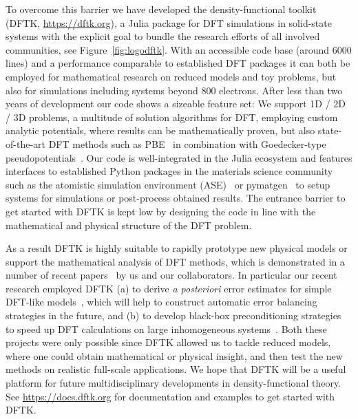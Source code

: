 \documentclass{juliacon}
\begin{document}
To overcome this barrier we have developed
the density-functional toolkit (DFTK, \url{https://dftk.org}),
a Julia package for DFT simulations in solid-state systems
with the explicit goal to bundle the research efforts of all involved communities,
see Figure~\ref{fig:logodftk}.
With an accessible code base (around 6000 lines)
and a performance comparable to established DFT packages
it can both be employed for mathematical research
on reduced models and toy problems,
but also for simulations including systems beyond 800 electrons.
After less than two years of development our code
shows a sizeable feature set:
We support 1D / 2D / 3D problems, a multitude of solution algorithms for DFT,
employing custom analytic potentials, where results can be mathematically proven,
but also state-of-the-art DFT methods such as PBE~\cite{Perdew1996} in combination with
Goedecker-type pseudopotentials~\cite{Goedecker1996}.
Our code is well-integrated in the Julia ecosystem
and features interfaces to established Python packages
in the materials science community
such as the atomistic simulation environment (ASE)~\cite{HjorthLarsen2017} or
pymatgen~\cite{Ong2013} to setup systems for simulations or post-process obtained results.
The entrance barrier to get started with DFTK
is kept low by designing the code in line with the mathematical and physical structure
of the DFT problem.
\vskip 6pt

As a result DFTK is highly suitable to rapidly prototype
new physical models or support the mathematical analysis of DFT methods,
which is demonstrated in a number
of recent papers~\cite{scfanalysis,garrigue2021building,scfprecondition,scferror}
by us and our collaborators.
In particular our recent research employed DFTK
(a) to derive \textit{a posteriori} error estimates for simple DFT-like models~\cite{scferror},
which will help to construct automatic error balancing strategies in the future,
and (b) to develop black-box preconditioning strategies
to speed up DFT calculations on large inhomogeneous systems~\cite{scfprecondition}.
Both these projects were only possible since DFTK allowed us to tackle
reduced models, where one could obtain mathematical or physical insight,
and then test the new methods on realistic full-scale applications.
We hope that DFTK will be a useful platform
for future multidisciplinary developments in density-functional theory.
See \url{https://docs.dftk.org} for documentation and examples to get started with DFTK.
\vskip 6pt
\end{document}

